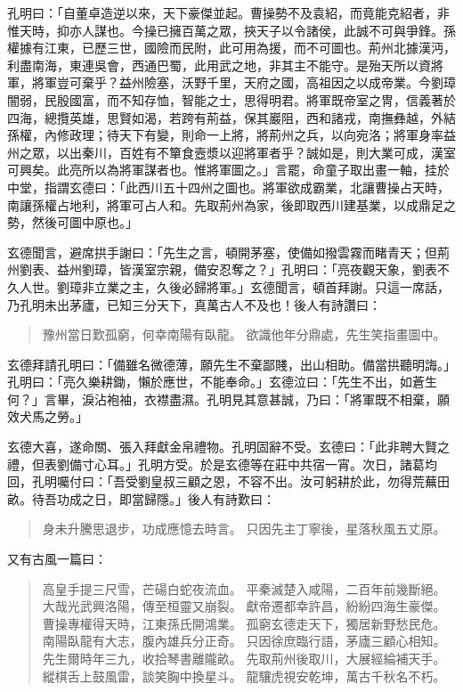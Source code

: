 孔明曰：「自董卓造逆以來，天下豪傑並起。曹操勢不及袁紹，而竟能克紹者，非惟天時，抑亦人謀也。今操已擁百萬之眾，挾天子以令諸侯，此誠不可與爭鋒。孫權據有江東，已歷三世，國險而民附，此可用為援，而不可圖也。荊州北據漢沔，利盡南海，東連吳會，西通巴蜀，此用武之地，非其主不能守。是殆天所以資將軍，將軍豈可棄乎？益州險塞，沃野千里，天府之國，高祖因之以成帝業。今劉璋闇弱，民殷國富，而不知存恤，智能之士，思得明君。將軍既帝室之冑，信義著於四海，總攬英雄，思賢如渴，若跨有荊益，保其巖阻，西和諸戎，南撫彝越，外結孫權，內修政理；待天下有變，則命一上將，將荊州之兵，以向宛洛；將軍身率益州之眾，以出秦川，百姓有不簞食壼漿以迎將軍者乎？誠如是，則大業可成，漢室可興矣。此亮所以為將軍謀者也。惟將軍圖之。」言罷，命童子取出畫一軸，挂於中堂，指謂玄德曰：「此西川五十四州之圖也。將軍欲成霸業，北讓曹操占天時，南讓孫權占地利，將軍可占人和。先取荊州為家，後即取西川建基業，以成鼎足之勢，然後可圖中原也。」

玄德聞言，避席拱手謝曰：「先生之言，頓開茅塞，使備如撥雲霧而睹青天；但荊州劉表、益州劉璋，皆漢室宗親，備安忍奪之？」孔明曰：「亮夜觀天象，劉表不久人世。劉璋非立業之主，久後必歸將軍。」玄德聞言，頓首拜謝。只這一席話，乃孔明未出茅廬，已知三分天下，真萬古人不及也！後人有詩讚曰：

\begin{quote}
豫州當日歎孤窮，何幸南陽有臥龍。
欲識他年分鼎處，先生笑指畫圖中。
\end{quote}

玄德拜請孔明曰：「備雖名微德薄，願先生不棄鄙賤，出山相助。備當拱聽明誨。」孔明曰：「亮久樂耕鋤，懶於應世，不能奉命。」玄德泣曰：「先生不出，如蒼生何？」言畢，淚沾袍袖，衣襟盡濕。孔明見其意甚誠，乃曰：「將軍既不相棄，願效犬馬之勞。」

玄德大喜，遂命關、張入拜獻金帛禮物。孔明固辭不受。玄德曰：「此非聘大賢之禮，但表劉備寸心耳。」孔明方受。於是玄德等在莊中共宿一宵。次日，諸葛均回，孔明囑付曰：「吾受劉皇叔三顧之恩，不容不出。汝可躬耕於此，勿得荒蕪田畝。待吾功成之日，即當歸隱。」後人有詩歎曰：

\begin{quote}
身未升騰思退步，功成應憶去時言。
只因先主丁寧後，星落秋風五丈原。
\end{quote}

又有古風一篇曰：

\begin{quote}
高皇手提三尺雪，芒碭白蛇夜流血。
平秦滅楚入咸陽，二百年前幾斷絕。
大哉光武興洛陽，傳至桓靈又崩裂。
獻帝遷都幸許昌，紛紛四海生豪傑。
曹操專權得天時，江東孫氏開鴻業。
孤窮玄德走天下，獨居新野愁民危。
南陽臥龍有大志，腹內雄兵分正奇。
只因徐庶臨行語，茅廬三顧心相知。
先生爾時年三九，收拾琴書離隴畝。
先取荊州後取川，大展經綸補天手。
縱棋舌上鼓風雷，談笑胸中換星斗。
龍驤虎視安乾坤，萬古千秋名不朽。
\end{quote}

